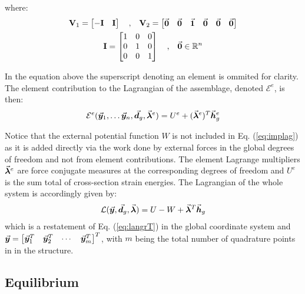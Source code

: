 \noindent where:
\begin{gather}
	\mathbf{V}_1 = \begin{bmatrix}
		-\mathbf{I} & \mathbf{I}
	\end{bmatrix}\quad\text{,}\quad
	\mathbf{V}_2 = \begin{bmatrix}
		\vec{\boldsymbol{0}} & \vec{\boldsymbol{0}} & \vec{\boldsymbol{1}} & \vec{\boldsymbol{0}} & \vec{\boldsymbol{0}} & \vec{\boldsymbol{0}}
	\end{bmatrix}\nonumber\\
	\mathbf{I} = \begin{bmatrix}
		1 & 0 & 0\\
		0 & 1 & 0\\
		0 & 0 & 1
	\end{bmatrix}\quad\text{,}\quad \vec{\boldsymbol{0}}\in\mathbb{R}^n\nonumber
\end{gather}

\noindent In the equation above the superscript denoting an element is ommited
for clarity. The element contribution to the Lagrangian of the assemblage,
denoted $\mathcal{E}^e$, is then:
\begin{gather}
	\mathcal{E}^e(\vec{\boldsymbol{y}}_1,\dots \vec{\boldsymbol{y}}_n, \vec{\boldsymbol{d}}_g,\vec{\boldsymbol{\lambda}}^e) =
	U^e  + (\vec{\boldsymbol{\lambda}}^e)^T\vec{\boldsymbol{h}}^e_g
	\label{eq:implag}
\end{gather}

\noindent Notice that the external potential function $W$ is not included
in Eq. (\ref{eq:implag}) as it is added directly via the work done by external
forces in the global degrees of freedom and not from element contributions.
The element Lagrange multipliers $\vec{\boldsymbol{\lambda}}^e$ are force
conjugate measures at the corresponding degrees of freedom and $U^e$ is the
sum total of cross-section strain energies.
The Lagrangian of the whole system is accordingly given by:
\begin{gather}
	\mathcal{L}(\vec{\boldsymbol{y}}, \vec{\boldsymbol{d}}_g,\vec{\boldsymbol{\lambda}}) =
	U-W+\vec{\boldsymbol{\lambda}}^T\vec{\boldsymbol{h}}_g
\end{gather}
\noindent which is a restatement of Eq. (\ref{eq:langrT}) in the global 
coordinate
system and $\vec{\boldsymbol{y}} = \begin{bmatrix}
	\vec{\boldsymbol{y}}_1^T & \vec{\boldsymbol{y}}_2^T & \cdots & \vec{\boldsymbol{y}}_m^T
\end{bmatrix}^T$, with $m$ being the total number of quadrature points in in
the structure.

\subsection{Equilibrium}\label{subsection:CH2-S4SS1}

